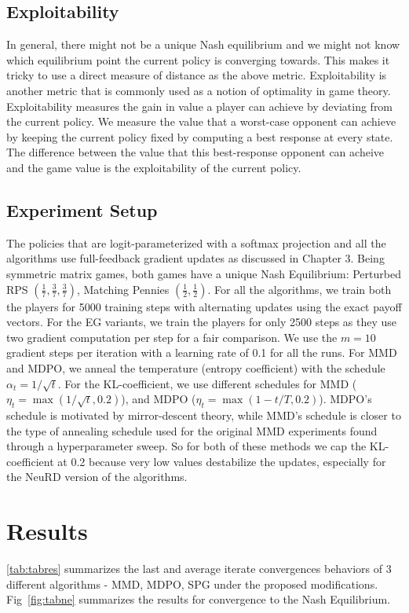 \subsection{Exploitability}
In general, there might not be a unique Nash equilibrium and we might not know which equilibrium
point the current policy is converging towards.
This makes it tricky to use a direct measure of distance as the above metric.
Exploitability is another metric that is commonly used as a notion of optimality in game theory.
Exploitability measures the gain in value a player can achieve by deviating from the current
policy.
We measure the value that a worst-case opponent can achieve by keeping the current policy fixed by
computing a best response at every state.
The difference between the value that this best-response opponent can acheive and the game value is
the exploitability of the current policy.


\subsection{Experiment Setup}
The policies that are logit-parameterized with a softmax projection and all the algorithms use
full-feedback gradient updates as discussed in Chapter 3.
Being symmetric matrix games, both games have a unique Nash Equilibrium: Perturbed RPS
$(\frac{1}{7}, \frac{3}{7}, \frac{3}{7})$, Matching Pennies $(\frac{1}{2}, \frac{1}{2})$.
For all the algorithms, we train both the players for 5000 training steps with alternating updates
using the exact payoff vectors.
For the EG variants, we train the players for only 2500 steps as they use two gradient computation
per step for a fair comparison.
We use the $m=10$ gradient steps per iteration with a learning rate of 0.1 for all the runs.
For MMD and MDPO, we anneal the temperature (entropy coefficient) with the schedule $\alpha_t =
	1/\sqrt{t}$.
For the KL-coefficient, we use different schedules for MMD ($\eta_t = \max(1 / \sqrt{t}, 0.2)$),
and MDPO ($\eta_t = \max(1 - t/T, 0.2)$).
MDPO's schedule is motivated by mirror-descent theory, while MMD's schedule is closer to the type
of annealing schedule used for the original MMD experiments found through a hyperparameter sweep.
So for both of these methods we cap the KL-coefficient at 0.2 because very low values destabilize
the updates, especially for the NeuRD version of the algorithms.

\section{Results} \ref{tab:tabres} summarizes the last and average
iterate convergences behaviors of 3 different algorithms - MMD, MDPO, SPG under the proposed
modifications.
Fig~\ref{fig:tabne} summarizes the results for convergence to the Nash Equilibrium.

